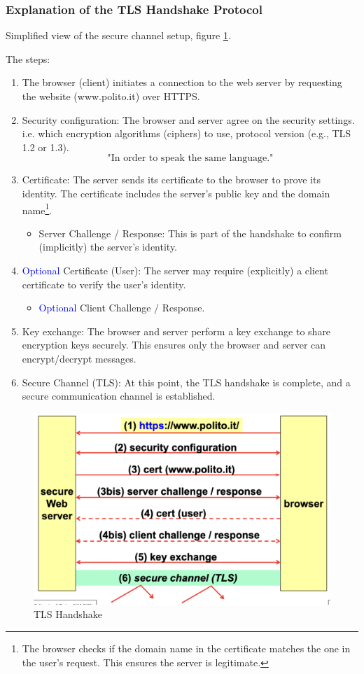 \subsubsection*{Explanation of the TLS Handshake Protocol}
\begin{center}
    Simplified view of the secure channel setup, figure \ref{fig:tls_handshake}.
\end{center}
The steps:
\begin{enumerate}
    \item The browser (client) initiates a connection to the web server by requesting the website (www.polito.it) over HTTPS.
    \item Security configuration: The browser and server agree on the security settings. i.e. which encryption algorithms (ciphers) to use, protocol version (e.g., TLS 1.2 or 1.3).
    \[
        \text{"In order to speak the same language."}
    \]
    \item Certificate: The server sends its certificate to the browser to prove its identity. The certificate includes the server's public key and the domain name\footnote{The browser checks if the domain name in the certificate matches the one in the user's request. This ensures the server is legitimate.}. 
    \begin{itemize}
        \item Server Challenge / Response: This is part of the handshake to confirm (implicitly) the server's identity.
    \end{itemize} 
    \item  \textcolor{Blue}{Optional} Certificate (User): The server may require (explicitly) a client certificate to verify the user's identity.
    \begin{itemize}
        \item \textcolor{Blue}{Optional} Client Challenge / Response.
    \end{itemize} 
    \item Key exchange: The browser and server perform a key exchange to share encryption keys securely. This ensures only the browser and server can encrypt/decrypt messages.
    \item Secure Channel (TLS): At this point, the TLS handshake is complete, and a secure communication channel is established.
\end{enumerate}

\begin{figure}[H]
    \centering
    \includegraphics[width=0.6\linewidth]{Images/Appsec/tls_handshake.png}
    \caption{TLS Handshake}
    \label{fig:tls_handshake}
\end{figure}

